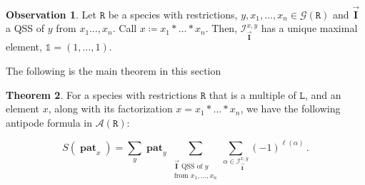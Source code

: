 \documentclass[12pt, reqno]{amsart}
\theoremstyle{definition}
\newtheorem{thm}{Theorem}[section]
\newtheorem{obs}[thm]{Observation}
\newcommand{\III}{\vec{\mathbf{I}}}
\DeclareMathOperator{\pat}{\mathbf{pat}}
\begin{document}
\


\begin{obs}
Let $\mathtt{R}$ be a species with restrictions, $y, x_1, \dots, x_n \in \mathcal G(\mathtt{R})$ and $\III$ a QSS of $y$ from $x_1\dots, x_n$.
Call $x \coloneqq x_1 \ast \dots \ast x_n$.
Then, $\mathcal I^{x, y}_{\III}$ has a unique maximal element, $\mathbb{1} = (1, \dots, 1)$.
\end{obs}

The following is the main theorem in this section

\begin{thm}\label{thm:general_antipode}
For a species with restrictions $\mathtt{R}$ that is a multiple of $\mathtt{L}$, and an element $x$, along with its factorization $x=x_1 \ast \dots \ast x_n$, we have the following antipode formula in $\mathcal A (\mathtt{R})$:

$$S(\pat_x) = \sum_y \pat_y \sum_{\substack{\III \text{ QSS of $y$}\\ \text{from }x_1, \dots , x_n}}  \sum_{\alpha \in \mathcal I^{x, y}_{\III}} (-1)^{\ell ( \alpha)} \, .$$
\end{thm}
\end{document}
